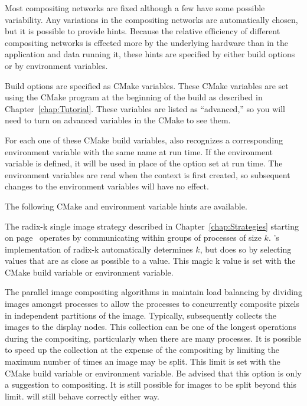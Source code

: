 Most compositing networks are fixed although a few have some possible
variability.  Any variations in the compositing networks are automatically
chosen, but it is possible to provide hints.  Because the relative
efficiency of different compositing networks is effected more by the
underlying hardware than in the application and data running it, these hints
are specified by either build options or by environment variables.

Build options are specified as CMake variables.  These CMake
variables are set using the CMake program at the beginning of the build as
described in Chapter~\ref{chap:Tutorial}.  These variables are listed as
``advanced,'' so you will need to turn on advanced variables in the CMake
to see them.

For each one of these CMake build variables, \IceT also recognizes a
corresponding environment variable with the same name at run time.  If the
environment variable is defined, it will be used in place of the option set
at run time.  The environment variables are read when the \IceT context is
first created, so subsequent changes to the environment variables will have
no effect.

The following CMake and environment variable hints are available.

\begin{Description}[xxxxxxxx]
\item[\CEnum{ICET\_MAGIC\_K}] The radix-k single image strategy described
  in Chapter~\ref{chap:Strategies} starting on
  page~\pageref{sec:Strategies:Radix-k} operates by communicating within
  groups of processes of size $k$.  \IceT's implementation of radix-k
  automatically determines $k$, but does so by selecting values that are as
  close as possible to a  value.  This
  magic k value is set with the  CMake build variable
  or environment variable.
\item[\CEnum{ICET\_MAX\_IMAGE\_SPLIT}] The parallel image compositing
  algorithms in \IceT maintain load balancing by dividing images amongst
  processes to allow the processes to concurrently composite pixels in
  independent partitions of the image.  Typically, \IceT subsequently
  collects the images to the display nodes.  This collection can be one of
  the longest operations during the compositing, particularly when there
  are many processes.  It is possible to speed up the collection at the
  expense of the compositing by limiting the maximum number of times an
  image may be split.  This limit is set with the
   CMake build variable or environment
  variable.  Be advised that this option is only a suggestion to
  compositing.  It is still possible for images to be split beyond this
  limit.  \IceT will still behave correctly either way.
\end{Description}


